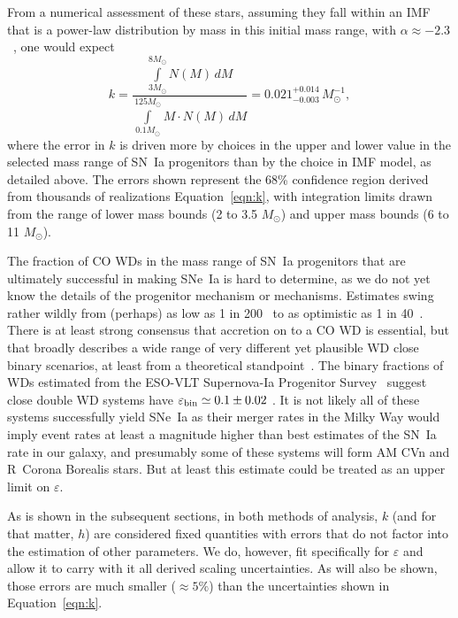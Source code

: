 \documentclass[apj, twocolumn]{aastex62}
\begin{document}
From a numerical assessment of these stars, assuming they fall within an IMF that is a power-law distribution by mass in this initial mass range, with $\alpha\approx-2.3$~\citep{Salpeter:1955rw,Kroupa:2001gf}, one would expect { 
\begin{equation}
k = \frac{\int\limits_{3M_{\odot}}^{8M_{\odot}} N(M)\,dM}{\int\limits_{0.1M_{\odot}}^{125M_{\odot}} M\cdot N(M)\,dM}= 0.021^{+0.014}_{-0.003}\,M_{\odot}^{-1},
\label{eqn:k}
\end{equation}}
\noindent where the error in $k$ is driven more by choices in the upper and lower value in the selected mass range of SN~Ia progenitors than by the choice in IMF model, as detailed above. {The errors shown represent the 68\% confidence region  derived from thousands of realizations Equation~\ref{eqn:k}, with integration limits drawn from the range of lower mass bounds (2 to 3.5 $M_{\odot}$) and upper mass bounds (6 to 11 $M_{\odot}$).} 

The fraction of CO WDs {in the mass range of SN~Ia progenitors} that are ultimately successful in making SNe~Ia is hard to determine, as we do not yet know the details of the progenitor mechanism or mechanisms. Estimates swing rather wildly from (perhaps) as low as 1 in 200~\citep{Breedt:2017rp} to as optimistic as 1 in 40~\citep{Maoz:2012}. There is at least strong consensus that accretion on to a CO WD is essential, but that broadly describes a wide range of very different yet plausible WD close binary scenarios, at least from a theoretical standpoint~\citep{Nelemans:2001hb,Nelemans:2001cs}. The binary fractions of WDs estimated from the ESO-VLT Supernova-Ia Progenitor Survey~\citep[SPY;][]{Napiwotzki:2007,Napiwotzki:2019ez} suggest close double WD systems have $\varepsilon_{\rm bin}\simeq0.1\pm0.02$ \citep{Maoz:2017zl}. It is not likely all of these systems successfully yield SNe~Ia as their merger rates in the Milky Way would imply event rates at least a magnitude higher than best estimates of the SN~Ia rate in our galaxy, and presumably some of these systems will form AM CVn and R~Corona Borealis stars. But at least this estimate could be treated as an upper limit on $\varepsilon$.

{As is shown in the subsequent sections, in both methods of analysis, $k$ (and for that matter, $h$) are considered fixed quantities with errors that do not factor into the estimation of other parameters. We do, however, fit specifically for $\varepsilon$ and allow it to carry with it all derived scaling uncertainties. As will also be shown, those errors are much smaller ($\approx5\%$) than the uncertainties shown in Equation~\ref{eqn:k}.}
\end{document}
